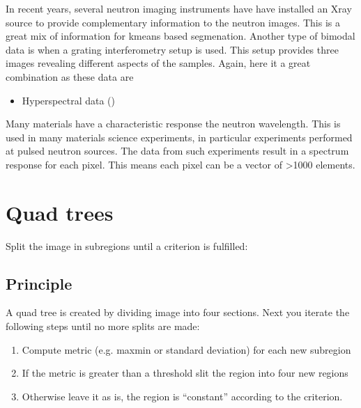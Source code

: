 \documentclass[letterpaper,10pt,english]{sphinxmanual}
\begin{document}
\sphinxAtStartPar
In recent years, several neutron imaging instruments have have installed an X\sphinxhyphen{}ray source to provide complementary information to the neutron images. This is a great mix of information for k\sphinxhyphen{}means based segmenation. Another type of bimodal data is when a grating interferometry setup is used. This setup provides three images revealing different aspects of the samples. Again, here it a great combination as these data are
\begin{itemize}
\item {} 
\sphinxAtStartPar
Hyper\sphinxhyphen{}spectral data ()

\end{itemize}

\sphinxAtStartPar
Many materials have a characteristic response the neutron wavelength. This is used in many materials science experiments, in particular experiments performed at pulsed neutron sources. The data from such experiments result in a spectrum response for each pixel. This means each pixel can be a vector of \textgreater{}1000 elements.


\chapter{Quad trees}
\label{\detokenize{05-AdvancedSegmentation:quad-trees}}
\sphinxAtStartPar
Split the image in subregions until a criterion is fulfilled:


\section{Principle}
\label{\detokenize{05-AdvancedSegmentation:principle}}
\sphinxAtStartPar
A quad tree is created by dividing image into four sections. Next you iterate the following steps until no more splits are made:
\begin{enumerate}
%
\item {} 
\sphinxAtStartPar
Compute metric (e.g. max\sphinxhyphen{}min or standard deviation) for each new sub\sphinxhyphen{}region

\item {} 
\sphinxAtStartPar
If the metric is greater than a threshold slit the region into four new regions

\item {} 
\sphinxAtStartPar
Otherwise leave it as is, the region is “constant” according to the criterion.

\end{enumerate}
\end{document}
